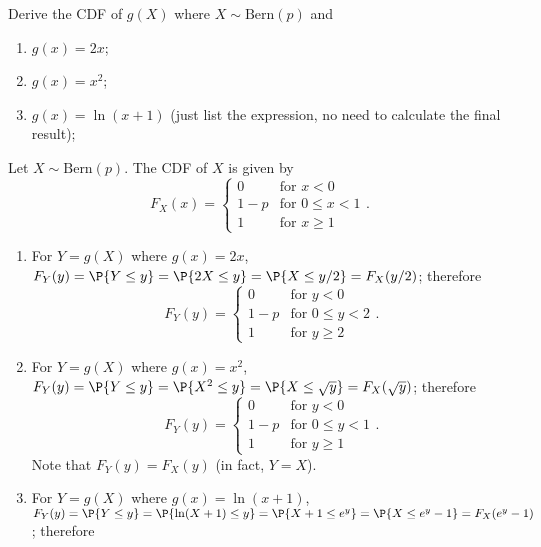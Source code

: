 \begin{exercise}
	Derive the CDF of $g(X)$ where $X\sim \text{Bern}(p)$ and 
	\begin{enumerate}
		\item $g(x)=2x$;
		\item $g(x)=x^2$;
		\item $g(x)=\ln (x+1)$ (just list the expression, no need to calculate the final result);
	\end{enumerate}
	\begin{solution}
		Let $X\sim \text{Bern}(p)$. The CDF of $X$ is given by
		\begin{equation*}
			F_X(x) =
			\begin{cases}
				0 & \text{for } x < 0 \\
				1 - p & \text{for } 0 \leq x < 1 \\
				1 & \text{for } x \geq 1
			\end{cases}.
		\end{equation*}
		\begin{enumerate}
			\item For $Y = g(X)$ where $g(x) = 2x$, $F_Y(y) = \P{Y \leq y} = \P{2X \leq y} = \P{X \leq y / 2} = F_X(y/2)$; therefore
			\begin{equation*}
				F_Y(y) =
				\begin{cases}
					0 & \text{for } y < 0 \\
					1 - p & \text{for } 0 \leq y < 2 \\
					1 & \text{for } y \geq 2
				\end{cases}.
			\end{equation*}
			\item For $Y = g(X)$ where $g(x) = x^2$, $F_Y(y) = \P{Y \leq y} = \P{X^2 \leq y} = \P{X \leq \sqrt{y}} = F_X(\sqrt{y})$; therefore
			\begin{equation*}
				F_Y(y) =
				\begin{cases}
					0 & \text{for } y < 0 \\
					1 - p & \text{for } 0 \leq y < 1 \\
					1 & \text{for } y \geq 1
				\end{cases}.
			\end{equation*}
			Note that $F_Y(y) = F_X(y)$ (in fact, $Y = X$).
			\item For $Y = g(X)$ where $g(x) = \ln(x + 1)$, $F_Y(y) = \P{Y \leq y} = \P{\ln(X + 1) \leq y} = \P{X + 1 \leq e^y} = \P{X \leq e^y - 1} = F_X(e^y - 1)$; therefore

\end{enumerate}
\end{solution}
\end{exercise}

